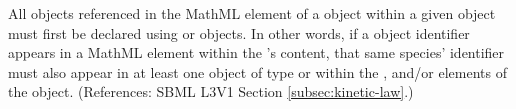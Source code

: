 All \Species objects referenced in the MathML  element of a
\KineticLaw object within a given \Reaction object must first be declared
using \SpeciesReference or \ModifierSpeciesReference objects.  In other
words, if a \Species object identifier appears in a MathML 
element within the \Reaction's \KineticLaw {} content, that same
species' identifier must also appear in at least one object of type
\SpeciesReference or \ModifierSpeciesReference within the
,  and/or
 elements of the \Reaction object.  (References:
SBML L3V1 Section \ref{subsec:kinetic-law}.)
